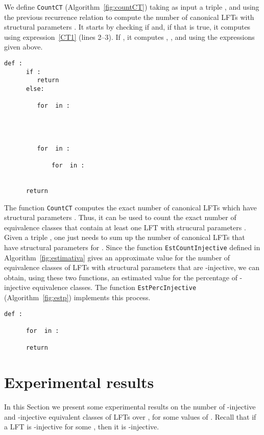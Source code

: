 \documentclass{ocg}
\newcommand{\LFT}{LFT}
\begin{document}
We define \texttt{CountCT} (Algorithm~\ref{fig:countCT})
taking as input a triple , and using
the previous recurrence relation to compute the number of canonical
\LFT{}s with structural parameters . It starts by checking if
 and, if that is true, it computes  using
expression~\eqref{CT1} (lines 2--3). If , it computes
, ,  and  using the
expressions given above.
\begin{lstlisting}[caption={Counting the number of canonical \LFT{}s.},label={fig:countCT}]
  def : 
      if :
         return 
      else:
         
         for  in :
             
         
         
          
         for  in :
             
             for  in :
                 
             
      return 
\end{lstlisting}
The function \texttt{CountCT}
computes the exact number of canonical \LFT{}s which have structural
parameters . Thus, it can be used to
count the exact number of equivalence classes that contain at least
one \LFT{} with strucural parameters . Given a triple
, one just needs to sum up the number of
canonical \LFT{}s that have structural parameters  for
. Since the function \texttt{EstCountInjective} defined in
Algorithm~\ref{fig:estimativa} gives an approximate value for the
number of equivalence classes of \LFT{}s with structural parameters
 that are -injective, we can obtain, using these two functions, an estimated value
for the percentage of -injective equivalence classes. The function
\texttt{EstPercInjective} (Algorithm~\ref{fig:estp}) implements this
process.
\begin{lstlisting}[caption={Estimating the percentage of -injective equivalence classes.},label={fig:estp}]
  def : 
      
      for  in : 
         
      return 
\end{lstlisting}
\vspace{-0.5cm}\section{Experimental results}\label{ExpRes}
In this Section we present some experimental results on the number of -injective and -injective equivalent classes of \LFT{}s over , for some values of . Recall that if a \LFT{} is -injective for some , then it is -injective.
\end{document}
